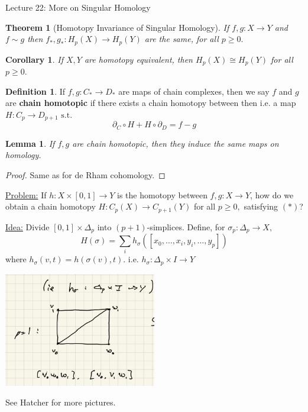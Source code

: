 \documentclass[10pt]{article}
\theoremstyle{plain}
\newtheorem{theorem}{Theorem}[section]
\newtheorem{corollary}[thm]{Corollary}
\newtheorem{lemma}[thm]{Lemma}
\theoremstyle{definition}
\newtheorem{defn}[thm]{Definition} %
\newcommand{\st}{\text{ s.t. }}
\newcommand{\sumfromto}[2]{\sum\limits_{#1}^{#2}}
\newcommand{\inter}{\left[0,1\right]}
\begin{document}
\begin{section}{Lecture 22: More on Singular Homology}

\begin{theorem}[Homotopy Invariance of Singular Homology]\label{thm:HomotopyInvarianceOfSingularHomology}
    If $f,g : X\to Y$ and $f\sim g$ then $f_*, g_* : H_p(X) \to H_p(Y)$ are the same, for all $p\geq 0.$
\end{theorem}

\begin{corollary}
    If $X,Y$ are homotopy equivalent, then $H_p(X) \cong H_p(Y) $ for all $p\geq 0.$
\end{corollary}

\begin{defn}
    If $f,g:C_*\to D_*$ are maps of chain complexes, then we say $f$ and $g$ are \textbf{chain homotopic} if there exists a chain homotopy between then i.e. a map $H:C_p \to D_{p+1} \st $ \begin{equation}\partial_C \circ H + H \circ \partial_D = f - g \tag{$*$} \end{equation}
\end{defn}

\begin{lemma}
    If $f,g$ are chain homotopic, then they induce the same maps on homology.
\end{lemma}
\begin{proof}
    Same as for de Rham cohomology.
\end{proof}

\underline{Problem:} If $h:X\times\inter \to Y$ is the homotopy between $f,g:X\to Y$, how do we obtain a chain homotopy $H:C_p(X) \to C_{p+1}(Y)$ for all $p\geq 0,$ satisfying $(*)$?

\underline{Idea:} Divide $\inter \times \Delta_p$ into $(p+1)$-simplices. Define, for $\sigma_p:\Delta_p\to X,$ $$H(\sigma) = \sumfromto{i}{} h_\sigma ([x_0,\ldots,x_i,y_i,\ldots,y_p])$$
where $h_\sigma(v,t) = h(\sigma(v),t).$ i.e. $h_\sigma : \Delta_p\times I \to Y$
\begin{center}\includegraphics[width = 0.5\textwidth]{ChainHomotopySimplices.png}\end{center}
See Hatcher for more pictures.


\end{section}
\end{document}
